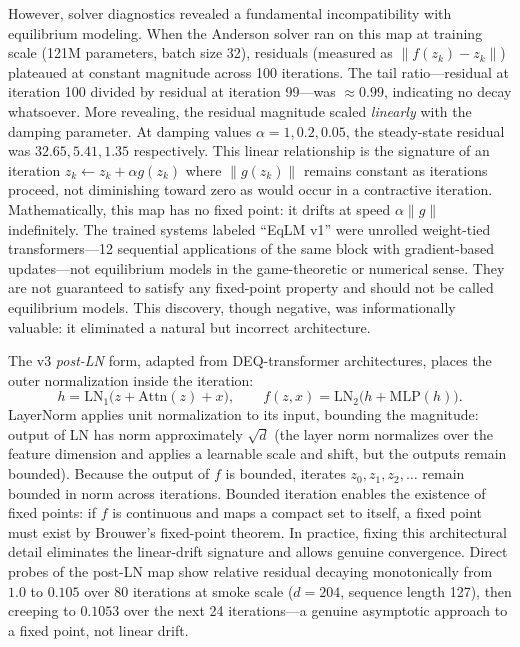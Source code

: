However, solver diagnostics revealed a fundamental incompatibility with equilibrium modeling. When the Anderson solver ran on this map at training scale (121M parameters, batch size 32), residuals (measured as $\|f(z_k) - z_k\|$) plateaued at constant magnitude across 100 iterations. The tail ratio---residual at iteration 100 divided by residual at iteration 99---was $\approx 0.99$, indicating no decay whatsoever. More revealing, the residual magnitude scaled \emph{linearly} with the damping parameter. At damping values $\alpha = 1, 0.2, 0.05$, the steady-state residual was $32.65, 5.41, 1.35$ respectively. This linear relationship is the signature of an iteration $z_k \leftarrow z_k + \alpha g(z_k)$ where $\|g(z_k)\|$ remains constant as iterations proceed, not diminishing toward zero as would occur in a contractive iteration. Mathematically, this map has no fixed point: it drifts at speed $\alpha \|g\|$ indefinitely. The trained systems labeled ``EqLM v1'' were unrolled weight-tied transformers---12 sequential applications of the same block with gradient-based updates---not equilibrium models in the game-theoretic or numerical sense. They are not guaranteed to satisfy any fixed-point property and should not be called equilibrium models. This discovery, though negative, was informationally valuable: it eliminated a natural but incorrect architecture.

The v3 \emph{post-LN} form, adapted from DEQ-transformer architectures, places the outer normalization inside the iteration:
\begin{equation}
h = \mathrm{LN}_1\!\big(z + \mathrm{Attn}(z) + x\big), \qquad f(z, x) = \mathrm{LN}_2\!\big(h + \mathrm{MLP}(h)\big).
\label{eq:postln_map}
\end{equation}
LayerNorm applies unit normalization to its input, bounding the magnitude: output of $\mathrm{LN}$ has norm approximately $\sqrt{d}$ (the layer norm normalizes over the feature dimension and applies a learnable scale and shift, but the outputs remain bounded). Because the output of $f$ is bounded, iterates $z_0, z_1, z_2, \ldots$ remain bounded in norm across iterations. Bounded iteration enables the existence of fixed points: if $f$ is continuous and maps a compact set to itself, a fixed point must exist by Brouwer's fixed-point theorem. In practice, fixing this architectural detail eliminates the linear-drift signature and allows genuine convergence. Direct probes of the post-LN map show relative residual decaying monotonically from $1.0$ to $0.105$ over 80 iterations at smoke scale ($d=204$, sequence length 127), then creeping to $0.1053$ over the next 24 iterations---a genuine asymptotic approach to a fixed point, not linear drift.

